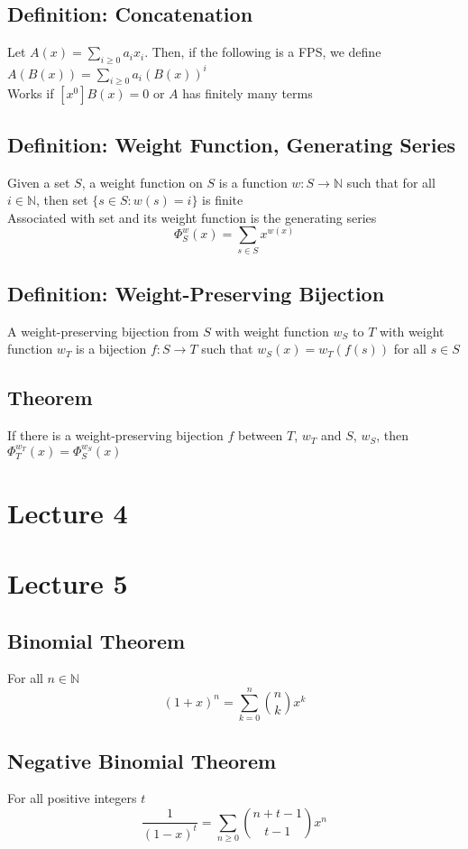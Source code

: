 \documentclass[11pt]{article}
\newcommand{\N}{{\mathbb{N}}}
\begin{document}
\subsection{Definition: Concatenation}
Let $A(x)=\sum_{i\geq0}a_ix_i$. Then, if the following is a FPS, we define $A(B(x))=\sum_{i\geq0}a_i(B(x))^i$ \\
Works if $[x^0]B(x)=0$ or $A$ has finitely many terms 
\subsection{Definition: Weight Function, Generating Series}
Given a set $S$, a weight function on $S$ is a function $w: S\rightarrow\N$ such that for all $i\in\N$, then set $\{s\in S: w(s)=i\}$ is finite \\
Associated with set and its weight function is the generating series 
\[\Phi^w_S(x) = \sum_{s\in S}x^{w(x)}\]
\subsection{Definition: Weight-Preserving Bijection}
A weight-preserving bijection from $S$ with weight function $w_S$ to $T$ with weight function $w_T$ is a bijection $f:S\rightarrow T$ such that $w_S(x)=w_T(f(s))$ for all $s\in S$
\subsection{Theorem}
If there is a weight-preserving bijection $f$ between $T$, $w_T$ and $S$, $w_S$, then $\Phi_T^{w_T}(x) = \Phi_S^{w_S}(x)$

\section{Lecture 4}

\section{Lecture 5}
\subsection{Binomial Theorem}
For all $n\in\N$
\[(1+x)^n = \sum_{k=0}^{n}{n\choose k}x^k\]
\subsection{Negative Binomial Theorem }
For all positive integers $t$
\[\frac{1}{(1-x)^t} = \sum_{n\geq0}{n+t-1\choose t-1}x^n\]
\end{document}
